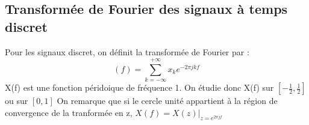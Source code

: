 \subsection{Transformée de Fourier des signaux à temps discret}
Pour les signaux discret, on définit la transformée de Fourier par : \[(f)=\sum_{k=-\infty}^{+\infty} x_k e^{-2\pi jkf}\]
X(f) est une fonction péridoique de fréquence 1. On étudie donc X(f) sur $[-\frac{1}{2}, \frac{1}{2}]$ ou sur $[0,1]$
On remarque que si le cercle unité appartient à la région de convergence de la tranformée en z, $X(f)={X(z)}|_{z=e^{2\pi jf}}$
